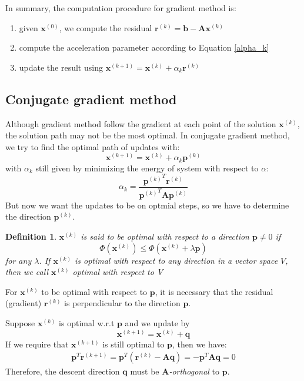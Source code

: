 \documentclass{article}
\newtheorem*{definition}{Definition}
\begin{document}
In summary, the computation procedure for gradient method is:
\begin{enumerate}
    \item given $\mathbf{x}^{(0)}$, we compute the residual 
        $\mathbf{r}^{(k)} = \mathbf{b} - \mathbf{A}\mathbf{x}^{(k)}$
    \item compute the acceleration parameter according to Equation \eqref{alpha_k}
    \item update the result using $\mathbf{x}^{(k+1)} = \mathbf{x}^{(k)} + \alpha_k \mathbf{r}^{(k)}$
\end{enumerate}

\subsection{Conjugate gradient method}
Although gradient method follow the gradient at each point of the solution $\mathbf{x}^{(k)}$,
the solution path may not be the most optimal. In conjugate gradient method, we try to find 
the optimal path of updates with:
\begin{equation}
    \mathbf{x}^{(k+1)} = \mathbf{x}^{(k)} + \alpha_k \mathbf{p}^{(k)}
\end{equation}
with $\alpha_k$ still given by minimizing the energy of system with respect to $\alpha$:
\begin{equation}
    \alpha_k = 
    \frac{\left.\mathbf{p}^{(k)}\right.^T \mathbf{r}^{(k)}}
    {\left.\mathbf{p}^{(k)}\right.^T \mathbf{A} \mathbf{p}^{(k)}}
\end{equation}
But now we want the updates to be on optmial steps, so we have to determine the 
direction $\mathbf{p}^{(k)}$.
\begin{definition}
    $\mathbf{x}^{(k)}$ is said to be \emph{optimal} with respect to a direction $\mathbf{p}\neq 0$
    if \[\Phi(\mathbf{x}^{(k)})\leq \Phi(\mathbf{x}^{(k)} + \lambda \mathbf{p})\]
    for any $\lambda$. If $\mathbf{x}^{(k)}$ is optimal with respect to any direction in a vector 
    space $V$, then we call $\mathbf{x}^{(k)}$ \emph{optimal with respect to} V
\end{definition}
For $\mathbf{x}^{(k)}$ to be optimal with respect to $\mathbf{p}$, it is necessary that 
the residual (gradient) $\mathbf{r}^{(k)}$ is perpendicular to the direction $\mathbf{p}$.

Suppose $\mathbf{x}^{(k)}$ is optimal w.r.t $\mathbf{p}$ and we update by 
\[\mathbf{x}^{(k+1)} = \mathbf{x}^{(k)} + \mathbf{q}\]
If we require that $\mathbf{x}^{(k+1)}$ is still optimal to $\mathbf{p}$, then 
we have:
\begin{align*}
    \mathbf{p}^T \mathbf{r}^{(k+1)} 
    = \mathbf{p}^T \left( \mathbf{r}^{(k)} - \mathbf{A}\mathbf{q} \right)
    = - \mathbf{p}^T \mathbf{A}\mathbf{q} = 0
\end{align*}
Therefore, the descent direction $\mathbf{q}$ must be \emph{$\mathbf{A}$-orthogonal} to 
$\mathbf{p}$. 
\end{document}
